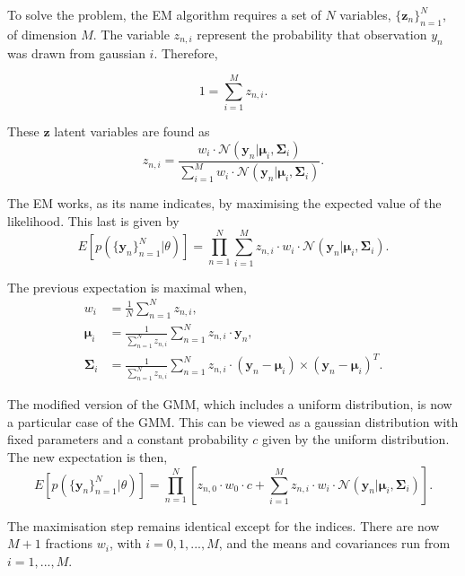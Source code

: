 To solve the problem, the EM algorithm requires  a set of $N$ variables, $\{\boldsymbol{z}_n\}_{n=1}^N$, of dimension $M$. The variable $z_{n,i}$ represent the probability that observation $y_n$ was drawn from gaussian $i$. Therefore,

\begin{equation}
1=\sum_{i=1}^M z_{n,i}.
\end{equation}

These $\boldsymbol{z}$ latent variables are found as
\begin{equation}
z_{n,i}= \frac{w_i\cdot \mathcal{N}(\mathbf{y}_n|\boldsymbol{\mu}_i,\boldsymbol{\Sigma}_i)}{\sum_{i=1}^M w_i\cdot \mathcal{N}(\mathbf{y}_n|\boldsymbol{\mu}_i,\boldsymbol{\Sigma}_i)}.
\end{equation}

The EM works, as its name indicates, by maximising the expected value of the likelihood. This last is given by
\begin{equation}
E[p(\{\mathbf{y}_n\}_{n=1}^N|\theta)]=\prod_{n=1}^N {\sum_{i=1} ^M {z_{n,i}\cdot w_i\cdot \mathcal{N}(\mathbf{y}_n|\boldsymbol{\mu}_i,\boldsymbol{\Sigma}_i)}}.
\end{equation}

The previous expectation is maximal when,
\begin{align}
w_i &= \frac{1}{N} \sum_{n=1}^N z_{n,i}, \\
\boldsymbol{\mu}_i &= \frac{1}{\sum_{n=1}^N z_{n,i}} \sum_{n=1}^N z_{n,i}\cdot \mathbf{y}_n,\\
\boldsymbol{\Sigma}_i &= \frac{1}{\sum_{n=1}^N z_{n,i}} \sum_{n=1}^N z_{n,i}\cdot (\mathbf{y}_n - \boldsymbol{\mu}_i)\times(\mathbf{y}_n-\boldsymbol{\mu}_i)^T.
\end{align}

The modified version of the GMM, which includes a uniform distribution, is now a particular case of the GMM. This can be viewed as a gaussian distribution with fixed parameters and a constant probability $c$ given by the uniform distribution. The new expectation is then,
\begin{equation}
E[p(\{\mathbf{y}_n\}_{n=1}^N|\theta)]=\prod_{n=1}^N {\left[z_{n,0}\cdot w_0 \cdot c + \sum_{i=1} ^M {z_{n,i}\cdot w_i\cdot \mathcal{N}(\mathbf{y}_n|\boldsymbol{\mu}_i,\boldsymbol{\Sigma}_i)}\right]}.
\end{equation}

The maximisation step remains identical except for the indices. There are now $M+1$ fractions $w_i$, with $i=0,1,...,M$, and the means and covariances run from $i=1,...,M$.

